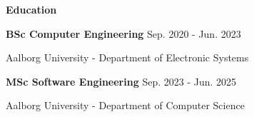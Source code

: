 \documentclass[a4paper, 14pt]{article}
\title{}
\date{}
\author{}
\newcommand{\cvsection}[2]{
    \begin{minipage}[t]{.25\textwidth}
        [ \textbf{#1} ]:
    \end{minipage}
    \vrule
    \hspace{2mm}
    \begin{minipage}[t]{.70\textwidth}
        #2
    \end{minipage}
    \vspace{.25cm}
}
\newcommand{\newcvsection}[2]{
    \noindent\huge \textbf{#1} \color{myorange}\hrulefill\color{black}
    
    \normalsize
    #2    
    \vspace{.5cm}
}
\begin{document}
    \begin{minipage}{.75\textwidth}
    \maketitle
    \end{minipage}
    \begin{minipage}{.25\textwidth}
    \end{minipage}



    \newcvsection{Education}{
        \noindent\textbf{BSc Computer Engineering} \hfill \color{gray} Sep. 2020 - Jun. 2023
        
        \color{black} Aalborg University - Department of Electronic Systems

        \noindent\textbf{MSc Software Engineering} \hfill \color{gray} Sep. 2023 - Jun. 2025

        \color{black} Aalborg University - Department of Computer Science
    }
\end{document}
